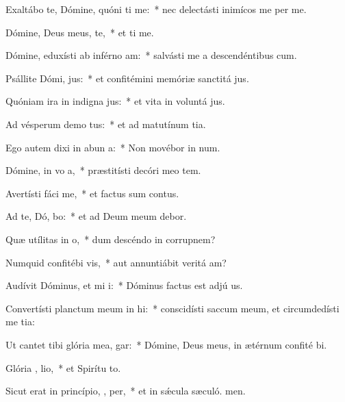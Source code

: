 \item Exaltábo te, Dómine, quóni ti me:~* nec delectásti inimícos me per me.
\item Dómine, Deus meus,   te,~* et ti me.
\item Dómine, eduxísti ab inférno  am:~* salvásti me a descendéntibus  cum.
\item Psállite Dómi,  jus:~* et confitémini memóriæ sanctitá jus.
\item Quóniam ira in indigna jus:~* et vita in voluntá jus.
\item Ad vésperum demo tus:~* et ad matutínum tia.
\item Ego autem dixi in abun a:~* Non movébor in num.
\item Dómine, in vo a,~* præstitísti decóri meo tem.
\item Avertísti fáci   me,~* et factus sum contus.
\item Ad te, Dó, bo:~* et ad Deum meum debor.
\item Quæ utílitas in  o,~* dum descéndo in corrupnem?
\item Numquid confitébi  vis,~* aut annuntiábit veritá am?
\item Audívit Dóminus, et mi  i:~* Dóminus factus est adjú us.
\item Convertísti planctum meum in  hi:~* conscidísti saccum meum, et circumdedísti me tia:
\item Ut cantet tibi glória mea,   gar:~* Dómine, Deus meus, in ætérnum confité bi.
\item Glória ,  lio,~* et Spirítu to.
\item Sicut erat in princípio,  ,  per,~* et in sǽcula sæculó. men.
